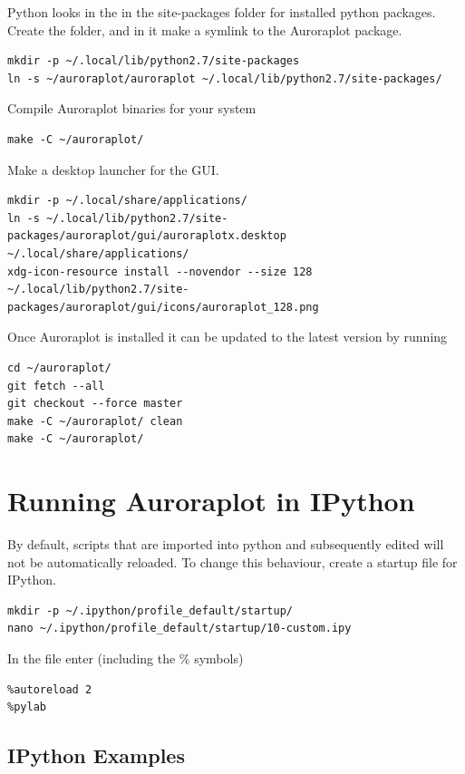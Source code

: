 \documentclass{article}
\begin{document}
Python looks in the in the site-packages folder for installed python packages. Create the folder, and in it make a symlink to the Auroraplot package.
\begin{lstlisting}
mkdir -p ~/.local/lib/python2.7/site-packages
ln -s ~/auroraplot/auroraplot ~/.local/lib/python2.7/site-packages/
\end{lstlisting}

Compile Auroraplot binaries for your system
\begin{lstlisting}
make -C ~/auroraplot/
\end{lstlisting}

Make a desktop launcher for the GUI.
\begin{lstlisting}
mkdir -p ~/.local/share/applications/
ln -s ~/.local/lib/python2.7/site-packages/auroraplot/gui/auroraplotx.desktop ~/.local/share/applications/
xdg-icon-resource install --novendor --size 128 ~/.local/lib/python2.7/site-packages/auroraplot/gui/icons/auroraplot_128.png
\end{lstlisting}

Once Auroraplot is installed it can be updated to the latest version by running
\begin{lstlisting}
cd ~/auroraplot/
git fetch --all
git checkout --force master
make -C ~/auroraplot/ clean
make -C ~/auroraplot/
\end{lstlisting}


\section{Running Auroraplot in IPython}

By default, scripts that are imported into python and subsequently edited will not be automatically reloaded.
To change this behaviour, create a startup file for IPython.

\begin{lstlisting}
mkdir -p ~/.ipython/profile_default/startup/
nano ~/.ipython/profile_default/startup/10-custom.ipy
\end{lstlisting}

In the file enter (including the \% symbols)
\begin{lstlisting}[style=pythonstyle]
%load_ext autoreload
%autoreload 2
%pylab
\end{lstlisting}

\subsection{IPython Examples}
\end{document}
